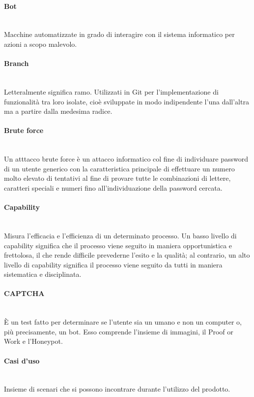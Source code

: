 \paragraph{Bot}~\smallskip \\
Macchine automatizzate in grado di interagire con il sistema informatico per azioni a scopo malevolo.

\paragraph{Branch}~\smallskip \\
Letteralmente significa ramo. Utilizzati in Git per l'implementazione di funzionalità tra loro isolate, cioè sviluppate in modo indipendente l'una dall'altra ma a partire dalla medesima radice.

\paragraph{Brute force}~\smallskip \\
Un atttacco brute force è un attacco informatico col fine di individuare password di un utente generico con la caratteristica principale di effettuare un numero molto elevato di tentativi al fine di provare tutte le combinazioni di lettere, caratteri speciali e numeri fino all'individuazione della password cercata.

\paragraph{Capability}~\smallskip \\
Misura l'efficacia e l'efficienza di un determinato processo. Un basso livello di capability significa che il processo viene seguito in maniera opportunistica e frettolosa, il che rende difficile prevederne l'esito e la qualità; al contrario, un alto livello di capability significa il processo viene seguito da tutti in maniera sistematica e disciplinata.

\paragraph{CAPTCHA}~\smallskip \\
È un test fatto per determinare se l'utente sia un umano e non un computer o, più precisamente, un bot.
Esso comprende l'insieme di immagini, il Proof or Work e l'Honeypot.

\paragraph{Casi d'uso}~\smallskip \\
Insieme di scenari che si possono incontrare durante l'utilizzo del prodotto.

